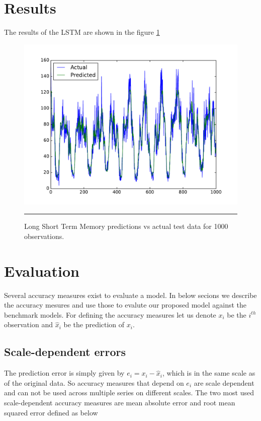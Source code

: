 \section{Results}

The results of the LSTM are shown in the figure \ref{fig:LstmActualPredicted}

\begin{figure}[htbp]
  \centering
    \includegraphics[width=\textwidth,height=\textheight,keepaspectratio]{Figures/lstm.pdf}
    \rule{35em}{0.5pt}
  \caption[LSTM - Actual vs Predictions]{Long Short Term Memory predictions vs actual test data for
  1000 observations.}
  \label{fig:LstmActualPredicted}
\end{figure}

\section{Evaluation}

Several accuracy measures exist to evaluate a model. In below secions we describe the accuracy
mesures and use those to evalute our proposed model against the benchmark models. For defining
the accuracy measures let us denote $x_{i}$ be the $i^{th}$ observation and $\hat{x}_{i}$ be the
prediction of $x_{i}$.

\subsection{Scale-dependent errors}
The prediction error is simply given by $e_{i} = x_{i} - \hat{x}_{i}$, which is in the same scale
as of the original data. So accuracy measures that depend on $e_{i}$ are scale dependent and can
not be used across multiple series on different scales. The two most used scale-dependent
accuracy measures are mean absolute error and root mean squared error defined as below


